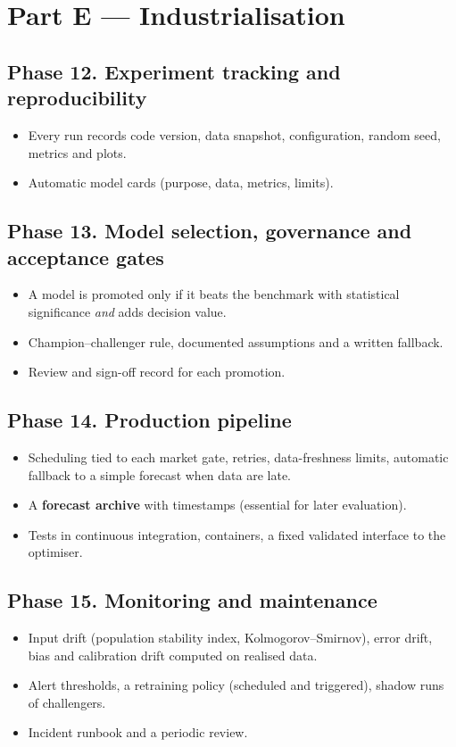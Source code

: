 \documentclass[11pt,a4paper]{article}
\begin{document}
\section{Part E --- Industrialisation}

\subsection{Phase 12. Experiment tracking and reproducibility}
\begin{itemize}
\item Every run records code version, data snapshot, configuration, random seed, metrics and plots.
\item Automatic model cards (purpose, data, metrics, limits).
\end{itemize}

\subsection{Phase 13. Model selection, governance and acceptance gates}
\begin{itemize}
\item A model is promoted only if it beats the benchmark with statistical significance \emph{and} adds decision value.
\item Champion--challenger rule, documented assumptions and a written fallback.
\item Review and sign-off record for each promotion.
\end{itemize}

\subsection{Phase 14. Production pipeline}
\begin{itemize}
\item Scheduling tied to each market gate, retries, data-freshness limits, automatic fallback to a simple forecast
  when data are late.
\item A \textbf{forecast archive} with timestamps (essential for later evaluation).
\item Tests in continuous integration, containers, a fixed validated interface to the optimiser.
\end{itemize}

\subsection{Phase 15. Monitoring and maintenance}
\begin{itemize}
\item Input drift (population stability index, Kolmogorov--Smirnov), error drift, bias and calibration drift
  computed on realised data.
\item Alert thresholds, a retraining policy (scheduled and triggered), shadow runs of challengers.
\item Incident runbook and a periodic review.
\end{itemize}
\end{document}
